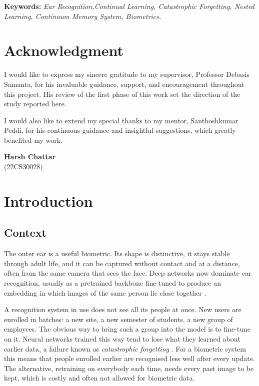 \documentclass[12pt,a4paper]{report}
\newcommand{\authorname}{Harsh Chattar}
\newcommand{\rollno}{22CS30028}
\begin{document}
\vspace{1.4cm}
\noindent \textbf{Keywords:} \textit{Ear Recognition,\linebreak[1] Continual Learning, Catastrophic Forgetting, Nested Learning, Continuum Memory System, Biometrics.}
\thispagestyle{empty}
\newpage

\setcounter{page}{4}
\chapter*{Acknowledgment}
I would like to express my sincere gratitude to my supervisor, Professor Debasis Samanta, for his invaluable guidance, support, and encouragement throughout this project. His review of the first phase of this work set the direction of the study reported here.

I would also like to extend my special thanks to my mentor, Santhoshkumar Peddi, for his continuous guidance and insightful suggestions, which greatly benefited my work.

\vfill
\begin{flushright}
\textbf{\authorname}\\
(\rollno)
\end{flushright}

\tableofcontents

\chapter{Introduction}

\section{Context}
The outer ear is a useful biometric. Its shape is distinctive, it stays stable through adult life, and it can be captured without contact and at a distance, often from the same camera that sees the face. Deep networks now dominate ear recognition, usually as a pretrained backbone fine-tuned to produce an embedding in which images of the same person lie close together \cite{emersic2017survey}.

A recognition system in use does not see all its people at once. New users are enrolled in batches: a new site, a new semester of students, a new group of employees. The obvious way to bring such a group into the model is to fine-tune on it. Neural networks trained this way tend to lose what they learned about earlier data, a failure known as \emph{catastrophic forgetting} \cite{mccloskey1989}. For a biometric system this means that people enrolled earlier are recognised less well after every update. The alternative, retraining on everybody each time, needs every past image to be kept, which is costly and often not allowed for biometric data.
\end{document}
